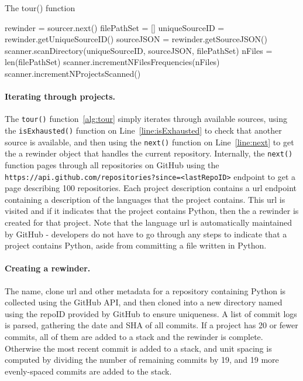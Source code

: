 \begin{algorithm}
  \caption{The tour() function}\label{alg:tour}
  \begin{algorithmic}[1]
 \label{line:isExhausted}
    \State rewinder = sourcer.next() \label{line:next}
    \State filePathSet = []
    \State uniqueSourceID = rewinder.getUniqueSourceID()
    \State sourceJSON = rewinder.getSourceJSON()
     \label{line:rewind}
        \State scanner.scanDirectory(uniqueSourceID, sourceJSON, filePathSet)\label{line:scanDirectory}
    \EndWhile
    \State nFiles = len(filePathSet)
    \State scanner.incrementNFilesFrequencies(nFiles)\label{line:fileFrequencies}
    \State scanner.incrementNProjectsScanned()\label{line:projectScannedCount}
\EndWhile
\end{algorithmic}
\end{algorithm}

\paragraph{Iterating through projects.} The {\tt tour()} function~\ref{alg:tour} simply iterates through available sources, using the {\tt isExhausted()} function on Line~\ref{line:isExhausted} to check that another source is available, and then using the {\tt next()} function on Line~\ref{line:next} to get the a rewinder object that handles the current repository.  Internally, the {\tt next()} function pages through all repositories on GitHub using the {\tt https://api.github.com/repositories?since=<lastRepoID>} endpoint to get a page describing 100 repositories.  Each project description contains a url endpoint containing a description of the languages that the project contains.  This url is visited and if it indicates that the project contains Python, then the a rewinder is created for that project.  Note that the language url is automatically maintained by GitHub - developers do not have to go through any steps to indicate that a project contains Python, aside from committing a file written in Python.

\paragraph{Creating a rewinder.}  The name, clone url and other metadata for a repository containing Python is collected using the GitHub API, and then cloned into a new directory named using the repoID provided by GitHub to ensure uniqueness.  A list of commit logs is parsed, gathering the date and SHA of all commits.  If a project has 20 or fewer commits, all of them are added to a stack and the rewinder is complete.  Otherwise the most recent commit is added to a stack, and unit spacing is computed by dividing the number of remaining commits by 19, and 19 more evenly-spaced commits are added to the stack.

